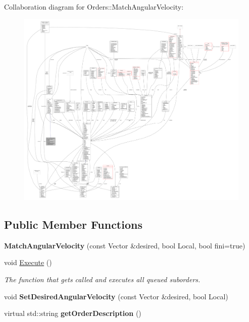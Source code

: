 Collaboration diagram for Orders\+:\+:Match\+Angular\+Velocity\+:
\nopagebreak
\begin{figure}[H]
\begin{center}
\leavevmode
\includegraphics[width=350pt]{da/da8/classOrders_1_1MatchAngularVelocity__coll__graph}
\end{center}
\end{figure}
\subsection*{Public Member Functions}
\begin{DoxyCompactItemize}
\item 
{\bfseries Match\+Angular\+Velocity} (const Vector \&desired, bool Local, bool fini=true)\hypertarget{classOrders_1_1MatchAngularVelocity_a52e6c60fe28dd16f5f3873b485c6b5bb}{}\label{classOrders_1_1MatchAngularVelocity_a52e6c60fe28dd16f5f3873b485c6b5bb}

\item 
void \hyperlink{classOrders_1_1MatchAngularVelocity_a323fc3701dac9728779b46244bbc3826}{Execute} ()\hypertarget{classOrders_1_1MatchAngularVelocity_a323fc3701dac9728779b46244bbc3826}{}\label{classOrders_1_1MatchAngularVelocity_a323fc3701dac9728779b46244bbc3826}

\begin{DoxyCompactList}\small\item\em The function that gets called and executes all queued suborders. \end{DoxyCompactList}\item 
void {\bfseries Set\+Desired\+Angular\+Velocity} (const Vector \&desired, bool Local)\hypertarget{classOrders_1_1MatchAngularVelocity_ab71cba3ee80175afaaef57700b24b508}{}\label{classOrders_1_1MatchAngularVelocity_ab71cba3ee80175afaaef57700b24b508}

\item 
virtual std\+::string {\bfseries get\+Order\+Description} ()\hypertarget{classOrders_1_1MatchAngularVelocity_ae64356e5ad21ddf67b208156cbfb414c}{}\label{classOrders_1_1MatchAngularVelocity_ae64356e5ad21ddf67b208156cbfb414c}

\end{DoxyCompactItemize}
